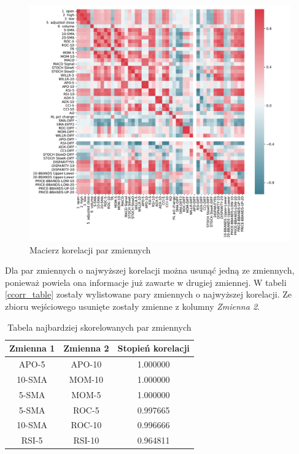 \documentclass[a4paper, twoside, 11pt, openright]{article}
\begin{document}
\begin{figure}[H]
\centering 
\includegraphics[scale=0.6]{img/corr_matrix.pdf}
\caption{Macierz korelacji par zmiennych}
\label{correlation}
\end{figure}

Dla par zmiennych o najwyższej korelacji można usunąć jedną ze zmiennych, ponieważ powiela ona informacje już zawarte w drugiej zmiennej.  W tabeli \ref{ccorr_table} zostały wylistowane pary zmiennych o najwyższej korelacji. Ze zbioru wejściowego usunięte zostały zmienne z kolumny \textit{Zmienna 2}.


\begin{table}[H]
\centering
\begin{tabular}{ |c|c|c| } 
 \hline
Zmienna 1 & Zmienna 2 &  Stopień korelacji \\
 \hline
APO-5 & APO-10 &  1.000000 \\
 \hline
10-SMA & MOM-10 &  1.000000 \\
 \hline
5-SMA & MOM-5 &  1.000000 \\
 \hline
5-SMA & ROC-5 &  0.997665 \\
 \hline
10-SMA & ROC-10 &  0.996666 \\
 \hline
RSI-5 & RSI-10 &  0.964811 \\  
 \hline
\end{tabular}
\caption{Tabela najbardziej skorelowanych par zmiennych}
\label{ccorr_table1}
\end{table}
\end{document}
